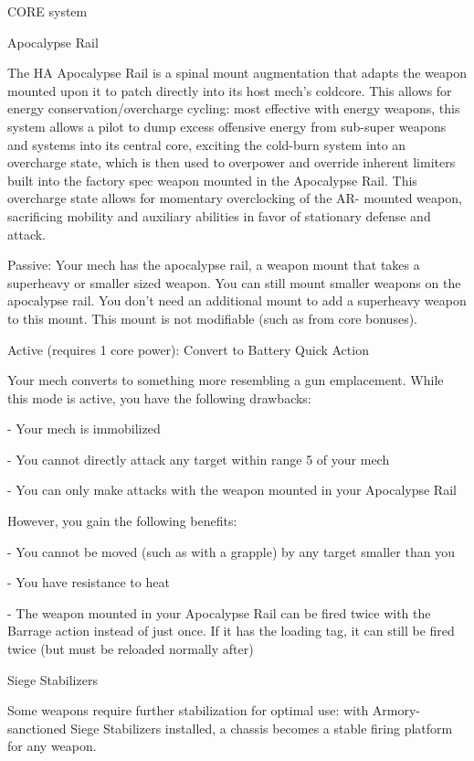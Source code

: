                                               CORE system




                                                Apocalypse Rail

 The HA Apocalypse Rail is a spinal mount augmentation that adapts the weapon mounted upon it to
 patch directly into its host mech’s coldcore. This allows for energy conservation/overcharge cycling:
 most effective with energy weapons, this system allows a pilot to dump excess offensive energy from
 sub-super weapons and systems into its central core, exciting the cold-burn system into an overcharge
 state, which is then used to overpower and override inherent limiters built into the factory spec weapon
 mounted in the Apocalypse Rail. This overcharge state allows for momentary overclocking of the AR-
 mounted weapon, sacrificing mobility and auxiliary abilities in favor of stationary defense and attack.

 Passive: Your mech has the apocalypse rail, a weapon mount that takes a superheavy or smaller sized
 weapon. You can still mount smaller weapons on the apocalypse rail. You don’t need an additional
 mount to add a superheavy weapon to this mount. This mount is not modifiable (such as from core
 bonuses).


 Active (requires 1 core power): Convert to Battery
 Quick Action

 Your mech converts to something more resembling a gun emplacement. While this mode is active, you
 have the following drawbacks:

      -   Your mech is immobilized

      -   You cannot directly attack any target within range 5 of your mech

      -   You can only make attacks with the weapon mounted in your Apocalypse Rail

 However, you gain the following benefits:

      -   You cannot be moved (such as with a grapple) by any target smaller than you

      -   You have resistance to heat

      -   The weapon mounted in your Apocalypse Rail can be fired twice with the Barrage action
          instead of just once. If it has the loading tag, it can still be fired twice (but must be reloaded
          normally after)

Siege Stabilizers

Some weapons require further stabilization for optimal use: with Armory-sanctioned Siege Stabilizers
installed, a chassis becomes a stable firing platform for any weapon.

